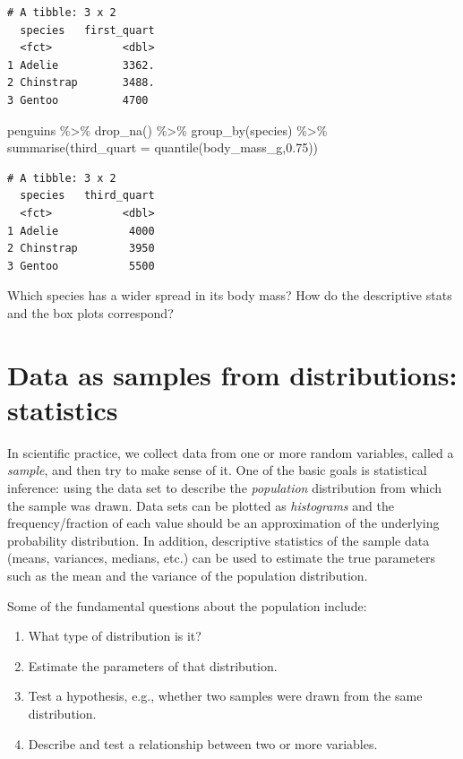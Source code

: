 \documentclass[
  letterpaper,
  DIV=11,
  numbers=noendperiod]{scrreprt}
\newenvironment{Shaded}{\begin{snugshade}}{\end{snugshade}}
\newcommand{\AttributeTok}[1]{\textcolor[rgb]{0.40,0.45,0.13}{#1}}
\newcommand{\FloatTok}[1]{\textcolor[rgb]{0.68,0.00,0.00}{#1}}
\newcommand{\FunctionTok}[1]{\textcolor[rgb]{0.28,0.35,0.67}{#1}}
\newcommand{\NormalTok}[1]{\textcolor[rgb]{0.00,0.23,0.31}{#1}}
\newcommand{\SpecialCharTok}[1]{\textcolor[rgb]{0.37,0.37,0.37}{#1}}
\begin{document}
\begin{verbatim}
# A tibble: 3 x 2
  species   first_quart
  <fct>           <dbl>
1 Adelie          3362.
2 Chinstrap       3488.
3 Gentoo          4700 
\end{verbatim}

\begin{Shaded}
\begin{Highlighting}[]
\NormalTok{penguins }\SpecialCharTok{\%\textgreater{}\%} \FunctionTok{drop\_na}\NormalTok{() }\SpecialCharTok{\%\textgreater{}\%} \FunctionTok{group\_by}\NormalTok{(species) }\SpecialCharTok{\%\textgreater{}\%} \FunctionTok{summarise}\NormalTok{(}\AttributeTok{third\_quart =} \FunctionTok{quantile}\NormalTok{(body\_mass\_g,}\FloatTok{0.75}\NormalTok{))}
\end{Highlighting}
\end{Shaded}

\begin{verbatim}
# A tibble: 3 x 2
  species   third_quart
  <fct>           <dbl>
1 Adelie           4000
2 Chinstrap        3950
3 Gentoo           5500
\end{verbatim}

Which species has a wider spread in its body mass? How do the
descriptive stats and the box plots correspond?

\hypertarget{data-as-samples-from-distributions-statistics}{%
\section{Data as samples from distributions:
statistics}\label{data-as-samples-from-distributions-statistics}}

In scientific practice, we collect data from one or more random
variables, called a \emph{sample}, and then try to make sense of it. One
of the basic goals is statistical inference: using the data set to
describe the \emph{population} distribution from which the sample was
drawn. Data sets can be plotted as \emph{histograms} and the
frequency/fraction of each value should be an approximation of the
underlying probability distribution. In addition, descriptive statistics
of the sample data (means, variances, medians, etc.) can be used to
estimate the true parameters such as the mean and the variance of the
population distribution.

Some of the fundamental questions about the population include:

\begin{enumerate}
\def\labelenumi{\arabic{enumi}.}
\item
  What type of distribution is it?
\item
  Estimate the parameters of that distribution.
\item
  Test a hypothesis, e.g., whether two samples were drawn from the same
  distribution.
\item
  Describe and test a relationship between two or more variables.
\end{enumerate}
\end{document}
